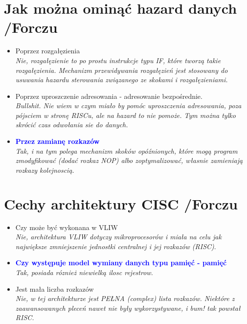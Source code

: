 \documentclass[a4paper,twoside]{article}
\begin{document}
\section{Jak można ominąć hazard danych {\small /Forczu}}
	\begin{itemize}
    \item Poprzez rozgałęzienia\\
    {\small \emph{Nie, rozgałęzienie to po prostu instrukcje typu IF, które tworzą takie rozgałęzienia. Mechanizm przewidywania rozgałęzień jest stosowany do usuwania hazardu sterowania związanego ze skokami i rozgałęzieniami.}}
    \item Poprzez uproszczenie adresowania - adresowanie bezpośrednie.\\
    {\small \emph{Bullshit. Nie wiem w czym miało by pomóc uproszczenia adresowania, poza pójsciem w stronę RISCu, ale na hazard to nie pomoże. Tym można tylko skrócić czas odwołania sie do danych.}}
    \item \textcolor{Blue}{\textbf{Przez zamianę rozkazów}}\\
    {\small \emph{Tak, i na tym polega mechanizm skoków opóźnionych, które mogą program zmodyfikować (dodać rozkaz NOP) albo zoptymalizować, własnie zamieniają rozkazy kolejnoscią.}}
    \end{itemize}

\section{Cechy architektury CISC {\small /Forczu}}
	\begin{itemize}
    \item Czy może być wykonana w VLIW\\
    {\small \emph{Nie, architektura VLIW dotyczy mikroprocesorów i miała na celu jak największe zmniejszenie jednostki centralnej i jej rozkazów (RISC)}. }
    \item \textcolor{Blue}{\textbf{Czy występuje model wymiany danych typu pamięć - pamięć}}\\
    {\small \emph{Tak, posiada róznież niewielką ilosc rejestrow.}}
    \item Jest mała liczba rozkazów\\
    {\small \emph{Nie, w tej architekturze jest PEŁNA (complex) lista rozkazów. Niektóre z zaawansowanych pleceń nawet nie były wykorzystywane, i bum! tak powstał RISC.}}
    \end{itemize}
\end{document}

